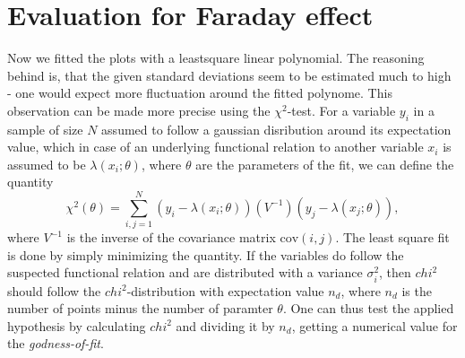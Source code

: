 \section{Evaluation for Faraday effect}
Now we fitted the plots with a leastsquare linear polynomial. 
The reasoning behind is, that the given standard deviations 
seem to be estimated much to high - one would expect more fluctuation 
around the fitted polynome. This observation can be made more 
precise using the $\chi^2$-test. For a variable $y_i$ in a sample of 
size $N$ assumed to follow 
a gaussian disribution around its expectation value, which in case of 
an underlying functional relation to another variable $x_i$ is assumed 
to be $\lambda(x_i; \theta)$, where $\theta$ are the parameters of 
the fit, we can define the quantity
\begin{equation}
    \chi^2(\theta) = \sum_{i, j= 1}^N (y_i - \lambda(x_i; \theta))
        (V^{-1}) (y_j - \lambda(x_j; \theta)), 
\end{equation}
where $V^{-1}$ is the inverse of the covariance matrix $\mathrm{cov}(i,j)$. 
The least square fit is done by simply minimizing the quantity. If the 
variables do follow the suspected functional relation and are distributed 
with a variance $\sigma_i^2$, then $chi^2$ should follow the 
$chi^2$-distribution with expectation value $n_d$, where $n_d$ is 
the number of points minus the number of paramter $\theta$.
One can thus test the applied hypothesis by calculating $chi^2$ and 
dividing it by $n_d$, getting a numerical value for the 
\emph{godness-of-fit}.
